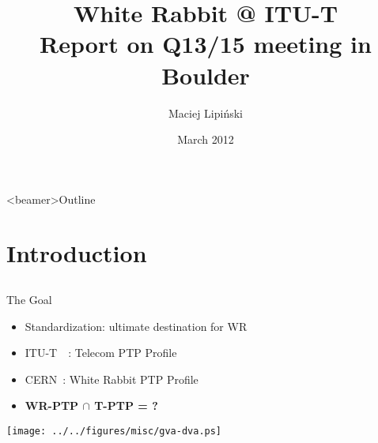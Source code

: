 \documentclass[compress,red]{beamer}
\title[ITU-T Q13/15 meeting report\hspace{2em}\insertframenumber/\inserttotalframenumber]
{White Rabbit @ ITU-T\\ Report on Q13/15 meeting in Boulder}
\institute{
   \begin{center}
    Hardware and Timing Section\\
    CERN
   \end{center}
}
\author{
Maciej Lipi\'{n}ski %
}
\date{March 2012}
\begin{document}
\frame{\titlepage}
\begin{frame}<beamer>{Outline}

    \tableofcontents %

\end{frame}
\section{Introduction}
\subsection{}
\begin{frame}{The Goal}
  
  \begin{itemize}
    \item Standardization: ultimate destination for WR
    \item ITU-T~~: Telecom PTP Profile 
    \item CERN~: White Rabbit PTP Profile 
    \item {\bf WR-PTP $\cap$ T-PTP = ?} 
  \end{itemize}

    \begin{center}
    \texttt{[image: ../../figures/misc/gva-dva.ps]}
    \end{center}


\end{frame}
\end{document}
